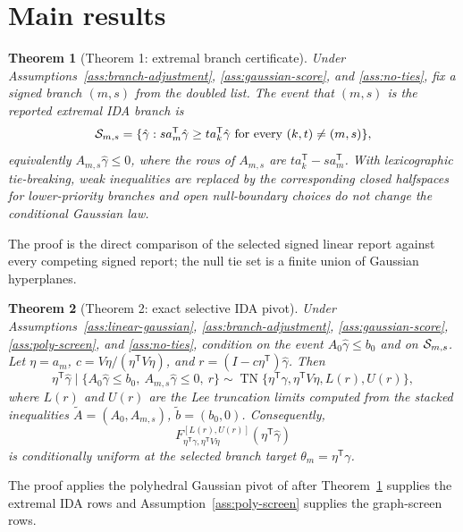 \documentclass[11pt]{article}
\newcommand{\transpose}{\mathsf{T}}
\theoremstyle{definition}
\theoremstyle{plain}
\newtheorem{theorem}{Theorem}
\theoremstyle{remark}
\begin{document}
\section{Main results}
\begin{theorem}[Theorem 1: extremal branch certificate]\label{thm:branch-polyhedron}
Under Assumptions~\ref{ass:branch-adjustment}, \ref{ass:gaussian-score}, and \ref{ass:no-ties}, fix a signed branch \((m,s)\) from the doubled list. The event that \((m,s)\) is the reported extremal IDA branch is
\[
{\cal S}_{m,s}=\{\hat\gamma: s a_m^\transpose\hat\gamma\ge t a_k^\transpose\hat\gamma
\text{ for every }(k,t)\ne(m,s)\},
\]
equivalently \(A_{m,s}\hat\gamma\le 0\), where the rows of \(A_{m,s}\) are \(t a_k^\transpose-s a_m^\transpose\). With lexicographic tie-breaking, weak inequalities are replaced by the corresponding closed halfspaces for lower-priority branches and open null-boundary choices do not change the conditional Gaussian law.
\end{theorem}
The proof is the direct comparison of the selected signed linear report against every competing signed report; the null tie set is a finite union of Gaussian hyperplanes.

\begin{theorem}[Theorem 2: exact selective IDA pivot]\label{thm:selected-pivot}
Under Assumptions~\ref{ass:linear-gaussian}, \ref{ass:branch-adjustment}, \ref{ass:gaussian-score}, \ref{ass:poly-screen}, and \ref{ass:no-ties}, condition on the event \(A_0\hat\gamma\le b_0\) and on \({\cal S}_{m,s}\). Let \(\eta=a_m\), \(c=V\eta/(\eta^\transpose V\eta)\), and \(r=(I-c\eta^\transpose)\hat\gamma\). Then
\[
\eta^\transpose\hat\gamma\mid \{A_0\hat\gamma\le b_0,\ A_{m,s}\hat\gamma\le 0,\ r\}
\sim \operatorname{TN}\{\eta^\transpose\gamma,\eta^\transpose V\eta,L(r),U(r)\},
\]
where \(L(r)\) and \(U(r)\) are the Lee truncation limits computed from the stacked inequalities \(\tilde A=(A_0,A_{m,s})\), \(\tilde b=(b_0,0)\). Consequently,
\[
F^{[L(r),U(r)]}_{\eta^\transpose\gamma,\eta^\transpose V\eta}(\eta^\transpose\hat\gamma)
\]
is conditionally uniform at the selected branch target \(\theta_m=\eta^\transpose\gamma\).
\end{theorem}
The proof applies the polyhedral Gaussian pivot of \citet{LeeSunSunTaylor2016Polyhedral} after Theorem~\ref{thm:branch-polyhedron} supplies the extremal IDA rows and Assumption~\ref{ass:poly-screen} supplies the graph-screen rows.
\end{document}
